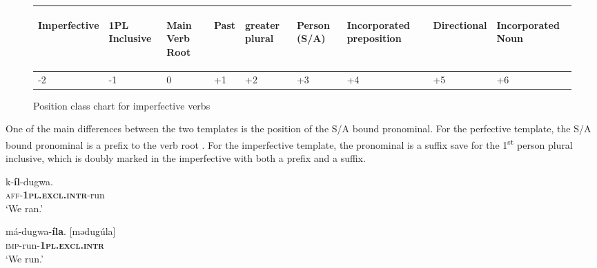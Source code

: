 \documentclass[output=paper]{langsci/langscibook}
\begin{document}
\begin{figure}
\begin{tabularx}{\textwidth}{XXXXXXXXp{3cm}}
\begin{turn}{33} Imperfective \end{turn} & \begin{turn}{33} 1PL Inclusive \end{turn} & \begin{turn}{33} Main Verb Root \end{turn} & \begin{turn}{33} Past \end{turn} & \begin{turn}{33} greater plural \end{turn} & \begin{turn}{33} Person (S/A) \end{turn} & \begin{turn}{33} Incorporated preposition \end{turn} & \begin{turn}{33} Directional \end{turn} & \begin{turn}{33} Incorporated Noun \end{turn} \\ \midrule
\multicolumn{1}{X}{{}-2} & \multicolumn{1}{X}{{}-1} & \multicolumn{1}{X}{0} & \multicolumn{1}{X}{+1} & \multicolumn{1}{X}{+2} & \multicolumn{1}{X}{+3} & \multicolumn{1}{X}{+4} & \multicolumn{1}{X}{+5} & +6\\
\end{tabularx}
\caption{Position class chart for  imperfective verbs}
\label{fig:ahlandc:3}
\end{figure}

One of the main differences between the two templates is the position of the S/A bound pronominal. For the perfective template, the S/A bound pronominal is a prefix to the verb root . For the imperfective template, the pronominal is a suffix  save for the 1\textsuperscript{st} person plural inclusive, which is doubly marked in the imperfective with both a prefix and a suffix. 

\ea\label{ex:ahlandc:6}
\gll 
k-\textbf{íl}{}-dugwa. \\
\textsc{aff}{}-\textbf{\textsc{1pl.excl.intr}}{}-run \\
\glt
‘We ran.’
\z

\ea\label{ex:ahlandc:7}
\gll 
má-dugwa-\textbf{íla}.   [mədug\'{u}la] \\
\textsc{imp}{}-run-\textbf{\textsc{1pl.excl.intr}} \\
\glt 
 ‘We run.’
\z
\end{document}
